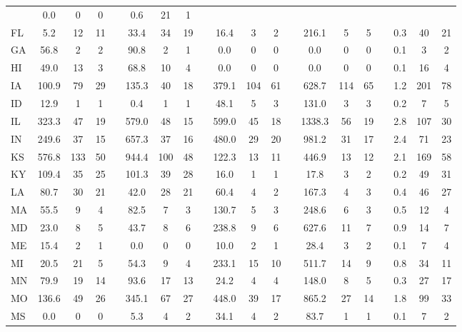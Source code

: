 \documentclass[11pt]{article}
\begin{document}
\begin{table}[t]
\begin{adjustbox}{max width=\textwidth}
\begin{tabular}{l ccc c ccc c ccc c ccc | c ccc}
 & 0.0 &  0 &  0 & 
 & 0.6 & 21 &  1 \\
 FL & 5.2 & 12 & 11 & 
 & 33.4 & 34 & 19 & 
 & 16.4 &  3 &  2 & 
 & 216.1 &  5 &  5 & 
 & 0.3 & 40 & 21 \\
 GA & 56.8 &  2 &  2 & 
 & 90.8 &  2 &  1 & 
 & 0.0 &  0 &  0 & 
 & 0.0 &  0 &  0 & 
 & 0.1 &  3 &  2 \\
 HI & 49.0 & 13 &  3 & 
 & 68.8 & 10 &  4 & 
 & 0.0 &  0 &  0 & 
 & 0.0 &  0 &  0 & 
 & 0.1 & 16 &  4 \\
 IA & 100.9 & 79 & 29 & 
 & 135.3 & 40 & 18 & 
 & 379.1 & 104 & 61 & 
 & 628.7 & 114 & 65 & 
 & 1.2 & 201 & 78 \\
 ID & 12.9 &  1 &  1 & 
 & 0.4 &  1 &  1 & 
 & 48.1 &  5 &  3 & 
 & 131.0 &  3 &  3 & 
 & 0.2 &  7 &  5 \\
 IL & 323.3 & 47 & 19 & 
 & 579.0 & 48 & 15 & 
 & 599.0 & 45 & 18 & 
 & 1338.3 & 56 & 19 & 
 & 2.8 & 107 & 30 \\
 IN & 249.6 & 37 & 15 & 
 & 657.3 & 37 & 16 & 
 & 480.0 & 29 & 20 & 
 & 981.2 & 31 & 17 & 
 & 2.4 & 71 & 23 \\
 KS & 576.8 & 133 & 50 & 
 & 944.4 & 100 & 48 & 
 & 122.3 & 13 & 11 & 
 & 446.9 & 13 & 12 & 
 & 2.1 & 169 & 58 \\
 KY & 109.4 & 35 & 25 & 
 & 101.3 & 39 & 28 & 
 & 16.0 &  1 &  1 & 
 & 17.8 &  3 &  2 & 
 & 0.2 & 49 & 31 \\
 LA & 80.7 & 30 & 21 & 
 & 42.0 & 28 & 21 & 
 & 60.4 &  4 &  2 & 
 & 167.3 &  4 &  3 & 
 & 0.4 & 46 & 27 \\
 MA & 55.5 &  9 &  4 & 
 & 82.5 &  7 &  3 & 
 & 130.7 &  5 &  3 & 
 & 248.6 &  6 &  3 & 
 & 0.5 & 12 &  4 \\
 MD & 23.0 &  8 &  5 & 
 & 43.7 &  8 &  6 & 
 & 238.8 &  9 &  6 & 
 & 627.6 & 11 &  7 & 
 & 0.9 & 14 &  7 \\
 ME & 15.4 &  2 &  1 & 
 & 0.0 &  0 &  0 & 
 & 10.0 &  2 &  1 & 
 & 28.4 &  3 &  2 & 
 & 0.1 &  7 &  4 \\
 MI & 20.5 & 21 &  5 & 
 & 54.3 &  9 &  4 & 
 & 233.1 & 15 & 10 & 
 & 511.7 & 14 &  9 & 
 & 0.8 & 34 & 11 \\
 MN & 79.9 & 19 & 14 & 
 & 93.6 & 17 & 13 & 
 & 24.2 &  4 &  4 & 
 & 148.0 &  8 &  5 & 
 & 0.3 & 27 & 17 \\
 MO & 136.6 & 49 & 26 & 
 & 345.1 & 67 & 27 & 
 & 448.0 & 39 & 17 & 
 & 865.2 & 27 & 14 & 
 & 1.8 & 99 & 33 \\
 MS & 0.0 &  0 &  0 & 
 & 5.3 &  4 &  2 & 
 & 34.1 &  4 &  2 & 
 & 83.7 &  1 &  1 & 
 & 0.1 &  7 &  2 \\

\end{tabular}
\end{adjustbox}
\end{table}
\end{document}
